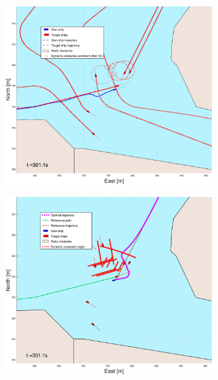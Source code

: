 \begin{figure}[ht!]\ContinuedFloat
    \begin{subfigure}[b]{0.49\textwidth}
        \centering
        \includegraphics[width=\textwidth]{Images/Figures/Trheimfjord/_Simple_0fig1_time=301}
    \end{subfigure}
    \hfill
    \begin{subfigure}[b]{0.499\textwidth}
        \centering
        \includegraphics[width=\textwidth]{Images/Figures/Trheimfjord/_Simple_0fig999_time=301}

\end{subfigure}
\end{figure}
